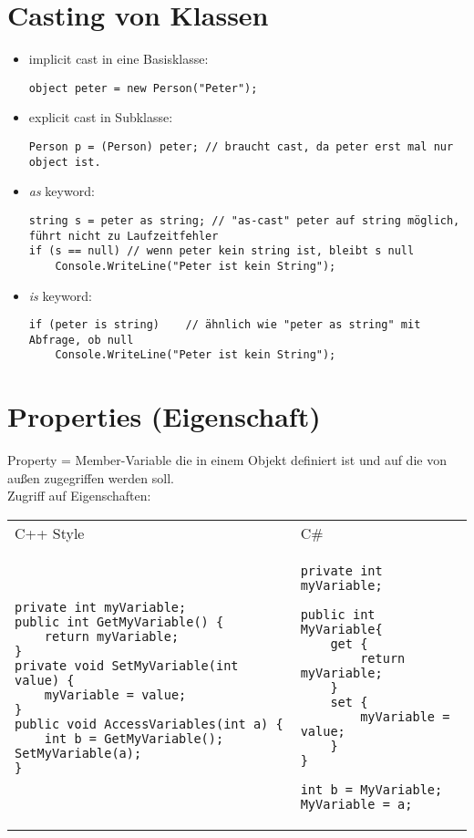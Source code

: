 \section{Casting von Klassen}
\begin{itemize}
\item implicit cast in eine Basisklasse:
\begin{lstlisting}[language={[Sharp]C}]
object peter = new Person("Peter");
\end{lstlisting}
\item explicit cast in Subklasse:
\begin{lstlisting}[language={[Sharp]C}]
Person p = (Person) peter; // braucht cast, da peter erst mal nur object ist.
\end{lstlisting} 
\item \emph{as} keyword: 
\begin{lstlisting}[language={[Sharp]C}]
string s = peter as string;	// "as-cast" peter auf string möglich, führt nicht zu Laufzeitfehler
if (s == null) // wenn peter kein string ist, bleibt s null
	Console.WriteLine("Peter ist kein String");
\end{lstlisting}
\item \emph{is} keyword: 
\begin{lstlisting}[language={[Sharp]C}]
if (peter is string)	// ähnlich wie "peter as string" mit Abfrage, ob null
	Console.WriteLine("Peter ist kein String");
\end{lstlisting}
\end{itemize}
\section{Properties (Eigenschaft)}
Property = Member-Variable die in einem Objekt definiert ist und auf die von außen zugegriffen werden soll.\\
Zugriff auf Eigenschaften: \\
\begin{tabular}{L{.5} L{.5}}
C++ Style &  C\#\\
\begin{lstlisting}[language={[Sharp]C}]
private int myVariable;
public int GetMyVariable() {
	return myVariable;
}
private void SetMyVariable(int value) {
	myVariable = value;
}
public void AccessVariables(int a) {
	int b = GetMyVariable(); SetMyVariable(a);
} 
\end{lstlisting} &
\begin{lstlisting}[language={[Sharp]C}]
private int myVariable;

public int MyVariable{
	get {
		return myVariable;
	}
	set {
		myVariable = value;
	}
}

int b = MyVariable;
MyVariable = a;
\end{lstlisting}\\
\end{tabular}

